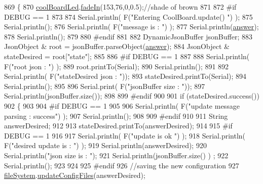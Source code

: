 \begin{DoxyCode}
869 \{
870     \hyperlink{class_cool_board_a1b1d3c684a5baa56b08486e192fd8e97}{coolBoardLed}.\hyperlink{class_cool_board_led_ab778f5e7bed0ab74e3906d82110493c3}{fadeIn}(153,76,0,0.5);\textcolor{comment}{//shade of brown        }
871 
872 \textcolor{preprocessor}{#if DEBUG == 1}
873 
874     Serial.println( F(\textcolor{stringliteral}{"Entering CoolBoard.update() "}) );
875     Serial.println();
876     Serial.println( F(\textcolor{stringliteral}{"message is : "}) );
877     Serial.println(\hyperlink{class_cool_board_a7b835fafd449e5282f7f91d787a2dc15}{answer});
878     Serial.println();
879 
880 \textcolor{preprocessor}{#endif}
881 
882     DynamicJsonBuffer jsonBuffer;
883     JsonObject & root = jsonBuffer.parseObject(\hyperlink{class_cool_board_a7b835fafd449e5282f7f91d787a2dc15}{answer});
884     JsonObject & stateDesired = root[\textcolor{stringliteral}{"state"}];
885 
886 \textcolor{preprocessor}{#if DEBUG == 1}
887 
888     Serial.println( F(\textcolor{stringliteral}{"root json : "}) );
889     root.printTo(Serial);
890     Serial.println();
891 
892     Serial.println( F(\textcolor{stringliteral}{"stateDesired json : "}));
893     stateDesired.printTo(Serial);
894     Serial.println();
895     
896     Serial.print( F(\textcolor{stringliteral}{"jsonBuffer size : "}));
897     Serial.println(jsonBuffer.size());
898 
899 \textcolor{preprocessor}{#endif}
900 
901     \textcolor{keywordflow}{if} (stateDesired.success())
902     \{
903     
904 \textcolor{preprocessor}{    #if DEBUG == 1}
905 
906         Serial.println( F(\textcolor{stringliteral}{"update message parsing : success"}) );
907         Serial.println();
908     
909 \textcolor{preprocessor}{    #endif}
910 
911             String answerDesired;
912         
913             stateDesired.printTo(answerDesired);
914             
915 \textcolor{preprocessor}{        #if DEBUG == 1      }
916         
917             Serial.println( F(\textcolor{stringliteral}{"update is ok "}) );
918             Serial.println( F(\textcolor{stringliteral}{"desired update is : "}) );            
919             Serial.println(answerDesired);
920             Serial.println(\textcolor{stringliteral}{"json size is : "});
921             Serial.println(jsonBuffer.size() ) ;                
922             Serial.println();
923 
924         
925 \textcolor{preprocessor}{        #endif}
926             \textcolor{comment}{//saving the new configuration}
927             \hyperlink{class_cool_board_a42c2586fbb13ff7f06538e9284e8538d}{fileSystem}.\hyperlink{class_cool_file_system_adfa8e2e80641ae6f0cceabd348a9b841}{updateConfigFiles}(answerDesired);

\end{DoxyCode}
